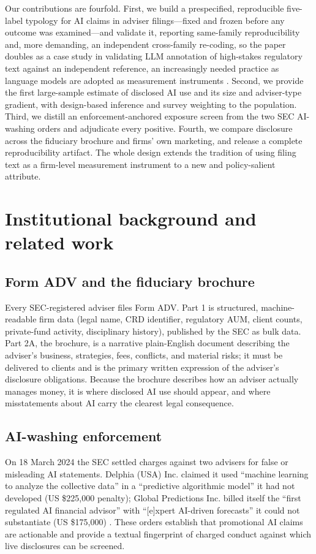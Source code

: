 \documentclass[utf8]{FrontiersinHarvard}
\begin{document}
Our contributions are fourfold. First, we build a prespecified, reproducible five-label typology for AI claims in adviser filings---fixed and frozen before any outcome was examined---and validate it, reporting same-family reproducibility and, more demanding, an independent cross-family re-coding, so the paper doubles as a case study in validating LLM annotation of high-stakes regulatory text against an independent reference, an increasingly needed practice as language models are adopted as measurement instruments \citep{gilardi2023,tornberg2023,ziems2024,rathje2024,ollion2024}. Second, we provide the first large-sample estimate of disclosed AI use and its size and adviser-type gradient, with design-based inference and survey weighting to the population. Third, we distill an enforcement-anchored exposure screen from the two SEC AI-washing orders and adjudicate every positive. Fourth, we compare disclosure across the fiduciary brochure and firms' own marketing, and release a complete reproducibility artifact. The whole design extends the tradition of using filing text as a firm-level measurement instrument \citep{tetlock2007,loughran2011,hoberg2016,cohenLazy2020,abis2022} to a new and policy-salient attribute.

\section{Institutional background and related work}

\subsection{Form ADV and the fiduciary brochure}
Every SEC-registered adviser files Form ADV. Part 1 is structured, machine-readable firm data (legal name, CRD identifier, regulatory AUM, client counts, private-fund activity, disciplinary history), published by the SEC as bulk data. Part 2A, the brochure, is a narrative plain-English document describing the adviser's business, strategies, fees, conflicts, and material risks; it must be delivered to clients and is the primary written expression of the adviser's disclosure obligations. Because the brochure describes how an adviser actually manages money, it is where disclosed AI use should appear, and where misstatements about AI carry the clearest legal consequence.

\subsection{AI-washing enforcement}
On 18 March 2024 the SEC settled charges against two advisers for false or misleading AI statements. Delphia (USA) Inc. claimed it used ``machine learning to analyze the collective data'' in a ``predictive algorithmic model'' it had not developed (US \$225{,}000 penalty); Global Predictions Inc. billed itself the ``first regulated AI financial advisor'' with ``[e]xpert AI-driven forecasts'' it could not substantiate (US \$175{,}000) \citep{usSEC2024a,usSEC2024b}. These orders establish that promotional AI claims are actionable and provide a textual fingerprint of charged conduct against which live disclosures can be screened.
\end{document}
